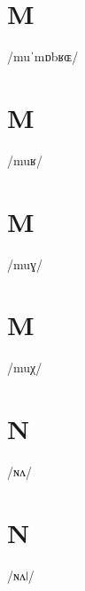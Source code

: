 \documentclass[10pt,a4paper,twoside]{book}
\begin{document}
\section*{M}

\begin{multicols}{3}
 {/muˈmɒbʁɶ/} {}
\end{multicols}

\section*{M}

\begin{multicols}{3}
 {/muʁ/} {}
\end{multicols}

\section*{M}

\begin{multicols}{3}
 {/muɣ/} {}
\end{multicols}

\section*{M}

\begin{multicols}{3}
 {/muχ/} {}
\end{multicols}

\section*{N}

\begin{multicols}{3}
 {/ɴʌ/} {}
\end{multicols}

\section*{N}

\begin{multicols}{3}
 {/ɴʌǀ/} {}
\end{multicols}
\end{document}
